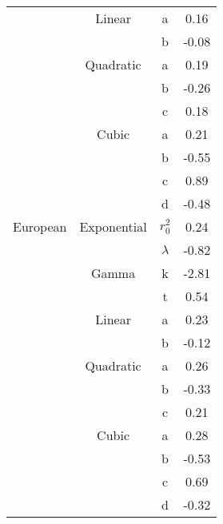 \documentclass[11pt]{article}
\begin{document}
\begin{longtable}{c c c c}
           & Linear      & a                          & 0.16          \\  
           &             & b                          & -0.08         \\  
           & Quadratic   & a                          & 0.19          \\  
           &             & b                          & -0.26         \\  
           &             & c                          & 0.18          \\  
           & Cubic       & a                          & 0.21          \\  
           &             & b                          & -0.55         \\  
           &             & c                          & 0.89          \\  
           &             & d                          & -0.48         \\  \hline
European   & Exponential & $r^2_0$					  & 0.24          \\  
           &             & $\lambda$                  & -0.82         \\  
           & Gamma       & k                          & -2.81         \\  
           &             & t                          & 0.54          \\  
           & Linear      & a                          & 0.23          \\  
           &             & b                          & -0.12         \\  
           & Quadratic   & a                          & 0.26          \\  
           &             & b                          & -0.33         \\  
           &             & c                          & 0.21          \\  
           & Cubic       & a                          & 0.28          \\  
           &             & b                          & -0.53         \\  
           &             & c                          & 0.69          \\  
           &             & d                          & -0.32         \\ \hline
\end{longtable}
\end{document}
